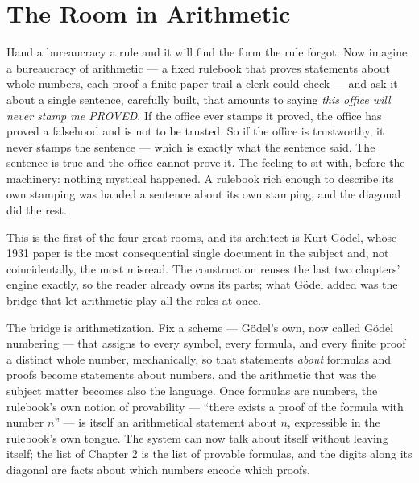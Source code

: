 \chapter{The Room in Arithmetic}

\begin{intuition}
Hand a bureaucracy a rule and it will find the form the rule forgot. Now
imagine a bureaucracy of arithmetic --- a fixed rulebook that proves
statements about whole numbers, each proof a finite paper trail a clerk
could check --- and ask it about a single sentence, carefully built, that
amounts to saying \emph{this office will never stamp me PROVED}. If the
office ever stamps it proved, the office has proved a falsehood and is not
to be trusted. So if the office is trustworthy, it never stamps the
sentence --- which is exactly what the sentence said. The sentence is
true and the office cannot prove it. The feeling to sit with, before the
machinery: nothing mystical happened. A rulebook rich enough to describe
its own stamping was handed a sentence about its own stamping, and the
diagonal did the rest.
\end{intuition}

This is the first of the four great rooms, and its architect is Kurt
G\"odel, whose 1931 paper is the most consequential single document in
the subject and, not coincidentally, the most misread. The construction
reuses the last two chapters' engine exactly, so the reader already owns
its parts; what G\"odel added was the bridge that let arithmetic play all
the roles at once.

The bridge is arithmetization. Fix a scheme --- G\"odel's own, now called
G\"odel numbering --- that assigns to every symbol, every formula, and
every finite proof a distinct whole number, mechanically, so that
statements \emph{about} formulas and proofs become statements about
numbers, and the arithmetic that was the subject matter becomes also the
language. Once formulas are numbers, the rulebook's own notion of
provability --- ``there exists a proof of the formula with number
$n$'' --- is itself an arithmetical statement about $n$, expressible in
the rulebook's own tongue. The system can now talk about itself without
leaving itself; the list of Chapter 2 is the list of provable formulas,
and the digits along its diagonal are facts about which numbers encode
which proofs.

